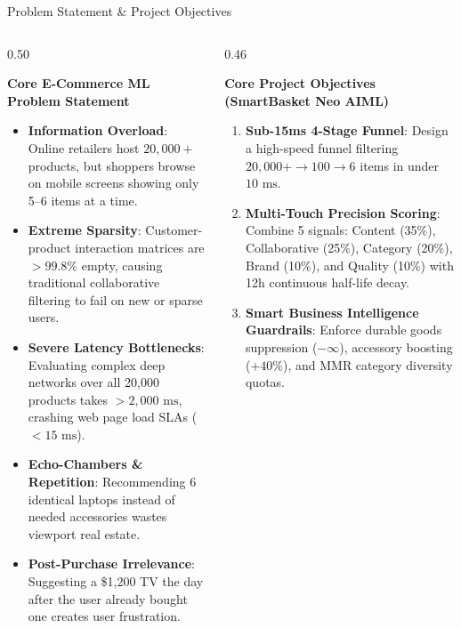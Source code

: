 \documentclass[10pt]{beamer}
\begin{document}
\begin{frame}{Problem Statement \& Project Objectives}
\begin{columns}[T]
    \begin{column}{0.50\textwidth}
        \begin{block}{\color{brandred}\textbf{Core E-Commerce ML Problem Statement}}
            \begin{itemize}\scriptsize
                \item \textbf{Information Overload}: Online retailers host $20,000+$ products, but shoppers browse on mobile screens showing only 5--6 items at a time.
                \item \textbf{Extreme Sparsity}: Customer-product interaction matrices are $>99.8\%$ empty, causing traditional collaborative filtering to fail on new or sparse users.
                \item \textbf{Severe Latency Bottlenecks}: Evaluating complex deep networks over all 20,000 products takes $>2,000\text{ ms}$, crashing web page load SLAs ($<15\text{ ms}$).
                \item \textbf{Echo-Chambers \& Repetition}: Recommending 6 identical laptops instead of needed accessories wastes viewport real estate.
                \item \textbf{Post-Purchase Irrelevance}: Suggesting a \$1,200 TV the day after the user already bought one creates user frustration.
            \end{itemize}
        \end{block}
    \end{column}%
    \begin{column}{0.46\textwidth}
        \begin{block}{\color{brandorange}\textbf{Core Project Objectives (SmartBasket Neo AIML)}}
            \begin{enumerate}\scriptsize
                \item \textbf{Sub-15ms 4-Stage Funnel}: Design a high-speed funnel filtering $20,000+ \to 100 \to 6$ items in under $10\text{ ms}$.
                \item \textbf{Multi-Touch Precision Scoring}: Combine 5 signals: Content (35\%), Collaborative (25\%), Category (20\%), Brand (10\%), and Quality (10\%) with 12h continuous half-life decay.
                \item \textbf{Smart Business Intelligence Guardrails}: Enforce durable goods suppression ($-\infty$), accessory boosting ($+40\%$), and MMR category diversity quotas.

\end{enumerate}
\end{block}
\end{column}
\end{columns}
\end{frame}
\end{document}
